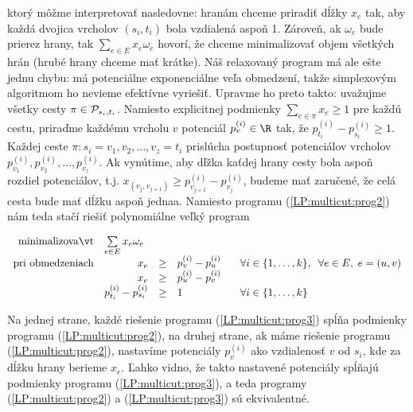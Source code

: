 \noindent
ktorý môžme interpretovať nasledovne: 
hranám chceme priradiť dĺžky $x_e$ tak, aby každá dvojica vrcholov $(s_i,t_i)$ bola vzdialená aspoň 1.
Zároveň, ak $\omega_e$ bude prierez hrany, tak $\sum_{e\in E}x_e\omega_e$ hovorí, že chceme minimalizovať 
objem všetkých hrán (hrubé hrany chceme mať krátke).
Náš relaxovaný program má ale ešte jednu chybu: má potenciálne exponenciálne veľa obmedzení, takže
simplexovým algoritmom ho nevieme efektívne vyriešiť. Upravme ho preto takto: uvažujme všetky cesty 
$\pi\in{\cal P}_{s_i,t_i}$. Namiesto explicitnej podmienky $\sum_{e\in\pi}x_e\ge1$ pre každú cestu, priraďme každému
vrcholu $v$ potenciál $p_v^{(i)}\in\R$ tak, že $p_{t_i}^{(i)}-p_{s_i}^{(i)}\ge1$. Každej ceste 
$\pi: s_i=v_1,v_2,\ldots,v_z=t_i$
prislúcha postupnosť potenciálov vrcholov $p_{v_1}^{(i)},p_{v_2}^{(i)},\ldots,p_{v_z}^{(i)}$. Ak 
vynútime, aby dľžka kaťdej hrany cesty bola aspoň rozdiel potenciálov, t.j.
$x_{(v_j,v_{j+1})}\ge p_{v_{j+1}}^{(i)}-p_{v_j}^{(i)}$, budeme mať zaručené, 
že celá cesta bude mať dĺžku aspoň jednaa.
Namiesto programu  (\ref{LP:multicut:prog2}) nám teda stačí riešiť polynomiálne veľký program

\begin{equation}
\label{LP:multicut:prog3}
\begin{array}{rrcll}
  {\rm minimalizovať}     & \multicolumn{1}{l}{ \sum\limits_{e\in E}x_e\omega_e}\\
  {\rm pri\ obmedzeniach} & x_e&\ge&p_v^{(i)}-p_u^{(i)}& \;\;\;
                              \forall i\in\{1,\ldots,k\},\;\; \forall e\in E, \;e=(u,v)\\
                          & x_e&\ge&p_u^{(i)}-p_v^{(i)}\\
                          & p_{t_i}^{(i)}-p_{s_i}^{(i)}&\ge&1& \;\;\;
                              \forall i\in\{1,\ldots,k\}\\
\end{array}
\end{equation}

\noindent
Na jednej strane, každé riešenie programu (\ref{LP:multicut:prog3}) spĺňa podmienky programu  (\ref{LP:multicut:prog2}),
na druhej strane, ak máme riešenie programu  (\ref{LP:multicut:prog2}), nastavíme potenciály $p_{v}^{(i)}$ ako
vzdialenosť $v$ od $s_i$, kde za dĺžku hrany berieme $x_e$. Ľahko vidno, že takto nastavené potenciály spĺňajú podmienky
programu  (\ref{LP:multicut:prog3}), a teda programy  (\ref{LP:multicut:prog2}) a  (\ref{LP:multicut:prog3}) sú ekvivalentné.


